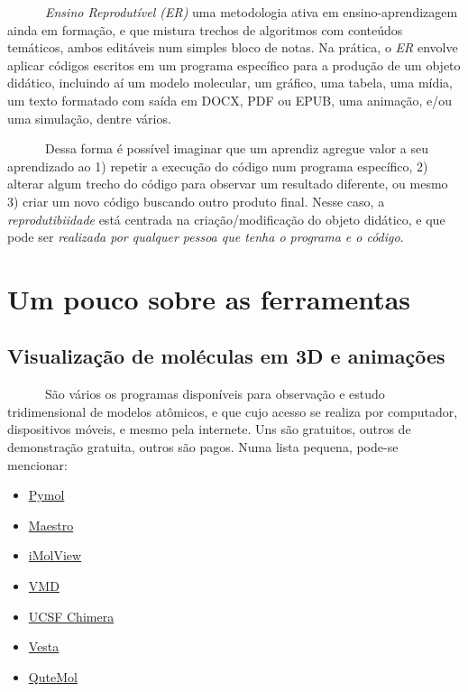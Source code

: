 \documentclass[
  letterpaper,
  DIV=11,
  numbers=noendperiod]{scrreprt}
\providecommand{\tightlist}{%
  \setlength{\itemsep}{0pt}\setlength{\parskip}{0pt}}\usepackage{longtable,booktabs,array}
\begin{document}
~~~~~~\emph{Ensino Reprodutível (ER)} uma metodologia ativa em
ensino-aprendizagem ainda em formação, e que mistura trechos de
algoritmos com conteúdos temáticos, ambos editáveis num simples bloco de
notas. Na prática, o \emph{ER} envolve aplicar códigos escritos em um
programa específico para a produção de um objeto didático, incluindo aí
um modelo molecular, um gráfico, uma tabela, uma mídia, um texto
formatado com saída em DOCX, PDF ou EPUB, uma animação, e/ou uma
simulação, dentre vários.

~~~~~~Dessa forma é possível imaginar que um aprendiz agregue valor a
seu aprendizado ao 1) repetir a execução do código num programa
específico, 2) alterar algum trecho do código para observar um resultado
diferente, ou mesmo 3) criar um novo código buscando outro produto
final. Nesse caso, a \emph{reprodutibiidade} está centrada na
criação/modificação do objeto didático, e que pode ser \emph{realizada
por qualquer pessoa que tenha o programa e o código}.


\chapter{Um pouco sobre as
ferramentas}\label{um-pouco-sobre-as-ferramentas}

\section{Visualização de moléculas em 3D e
animações}\label{visualizauxe7uxe3o-de-moluxe9culas-em-3d-e-animauxe7uxf5es}

~~~~~~São vários os programas disponíveis para observação e estudo
tridimensional de modelos atômicos, e que cujo acesso se realiza por
computador, dispositivos móveis, e mesmo pela internete. Uns são
gratuitos, outros de demonstração gratuita, outros são pagos. Numa lista
pequena, pode-se mencionar:

\begin{itemize}
\tightlist
\item
  \href{https://pymol.org/2/}{Pymol}
\item
  \href{https://www.schrodinger.com/products/maestro}{Maestro}
\item
  \href{https://www.molsoft.com/iMolview.html}{iMolView}
\item
  \href{https://www.ks.uiuc.edu/Development/Download/download.cgi?PackageName=VMD}{VMD}
\item
  \href{https://www.cgl.ucsf.edu/chimera/}{UCSF Chimera}
\item
  \href{https://jp-minerals.org/vesta/en/}{Vesta}
\item
  \href{https://qutemol.sourceforge.net/}{QuteMol}
\end{itemize}
\end{document}
